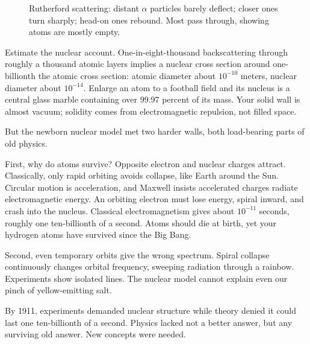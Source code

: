 \begin{figure}[htbp]
\centering
{}
\caption{Rutherford scattering: distant \(\alpha\) particles barely deflect; closer ones turn sharply; head-on ones rebound. Most pass through, showing atoms are mostly empty.}
\end{figure}

\begin{mainline}
Estimate the nuclear account. One-in-eight-thousand backscattering through roughly a thousand atomic layers implies a nuclear cross section around one-billionth the atomic cross section: atomic diameter about \(10^{-10}\) meters, nuclear diameter about \(10^{-14}\). Enlarge an atom to a football field and its nucleus is a central glass marble containing over 99.97 percent of its mass. Your solid wall is almost vacuum; solidity comes from electromagnetic repulsion, not filled space.

But the newborn nuclear model met two harder walls, both load-bearing parts of old physics.

First, why do atoms survive? Opposite electron and nuclear charges attract. Classically, only rapid orbiting avoids collapse, like Earth around the Sun. Circular motion is acceleration, and Maxwell insists accelerated charges radiate electromagnetic energy. An orbiting electron must lose energy, spiral inward, and crash into the nucleus. Classical electromagnetism gives about \(10^{-11}\) seconds, roughly one ten-billionth of a second. Atoms should die at birth, yet your hydrogen atoms have survived since the Big Bang.

Second, even temporary orbits give the wrong spectrum. Spiral collapse continuously changes orbital frequency, sweeping radiation through a rainbow. Experiments show isolated lines. The nuclear model cannot explain even our pinch of yellow-emitting salt.

By 1911, experiments demanded nuclear structure while theory denied it could last one ten-billionth of a second. Physics lacked not a better answer, but any surviving old answer. New concepts were needed.
\end{mainline}

